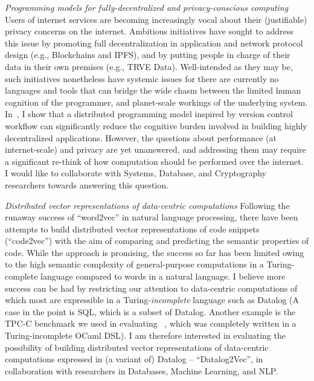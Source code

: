 {\itshape\color{MidnightBlue}Programming models for
fully-decentralized and privacy-conscious computing}  Users of
internet services are becoming increasingly vocal about their
(justifiable) privacy concerns on the internet. Ambitious initiatives
have sought to address this issue by promoting full decentralization in
application and network protocol design (e.g., Blockchains and IPFS),
and by putting people in charge of their data in their own premises
(e.g., TRVE Data).  Well-intended as they may be, such initiatives
nonetheless have systemic issues for there are currently no languages
and tools that can bridge the wide chasm between the limited human
cognition of the programmer, and planet-scale workings of the
underlying system. In~\cite{snapl19}, I show that a distributed
programming model inspired by version control workflow can
significantly reduce the cognitive burden involved in building highly
decentralized applications. However, the questions about performance
(at internet-scale) and privacy are yet unanswered, and addressing
them may require a significant re-think of how computation should be
performed over the internet. I would like to collaborate with Systems,
Database, and Cryptography researchers towards answering this
question.

{\itshape\color{MidnightBlue} Distributed vector representations of
data-centric computations} Following the runaway success of
``word2vec'' in natural language processing, there have been attempts
to build distributed vector representations of code snippets
(``code2vec'') with the aim of comparing and predicting the semantic
properties of code. While the approach is promising, the success so
far has been limited owing to the high semantic complexity of
general-purpose computations in a Turing-complete language compared to
words in a natural language. I believe more success can be had by
restricting our attention to data-centric computations of which most
are expressible in a Turing-\emph{incomplete} language such as Datalog (A
case in the point is SQL, which is a subset of Datalog. Another
example is the TPC-C benchmark we used in evaluating
\acidifier~\cite{popl18}, which was completely written in a
Turing-incomplete OCaml DSL). I am therefore interested in evaluating
the possibility of building distributed vector representations of
data-centric computations expressed in (a variant of) Datalog --
``Datalog2Vec'', in collaboration with researchers in Databases, 
Machine Learning, and NLP.

